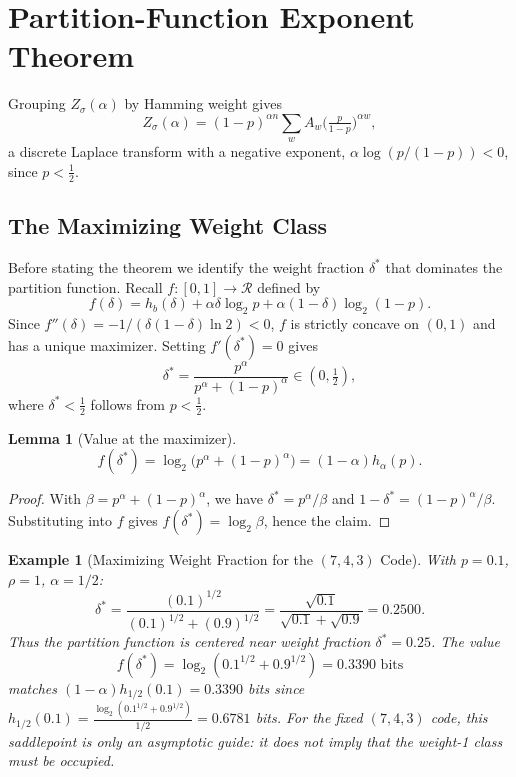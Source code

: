 \documentclass[journal,10pt,onecolumn]{IEEEtran}
\newtheorem{lemma}{Lemma}
\newtheorem{example}{Example}
\newcommand{\Hb}{h_b}
\newcommand{\Rb}{\mathcal{R}}
\begin{document}
\section{Partition-Function Exponent Theorem}
\label{sec:pf}

Grouping $Z_\sigma(\alpha)$ by Hamming weight gives
\[
Z_\sigma(\alpha)=(1-p)^{\alpha n}\sum_w A_w\bigl(\tfrac{p}{1-p}\bigr)^{\alpha w},
\]
a discrete Laplace transform with a negative exponent, $\alpha\log(p/(1-p))<0$, since $p<\tfrac{1}{2}$.



\subsection{The Maximizing Weight Class}

Before stating the theorem we identify the weight fraction
$\delta^*$ that dominates the partition function.
Recall $f:[0,1]\to \Rb$ defined by
\[
    f(\delta)=
    \Hb(\delta)
    +\alpha\delta\log_2 p
    +\alpha(1-\delta)\log_2(1-p).
\]
Since $f''(\delta)=-1/(\delta(1-\delta)\ln 2)<0$, $f$ is strictly
concave on $(0,1)$ and has a unique maximizer.
Setting $f'(\delta^*)=0$ gives
\[
    \delta^*
    =
    \frac{p^\alpha}{p^\alpha+(1-p)^\alpha}
    \in(0,\tfrac{1}{2}),
\]
where $\delta^*<\tfrac{1}{2}$ follows from $p<\tfrac{1}{2}$.

\begin{lemma}[Value at the maximizer]
\label{lem:f_max}
\[
\displaystyle f(\delta^*)
=\log_2\!\bigl(p^\alpha+(1-p)^\alpha\bigr)
=(1-\alpha)h_\alpha(p).\]
\end{lemma}
\begin{proof}
With \(\beta=p^\alpha+(1-p)^\alpha\), we have \(\delta^*=p^\alpha/\beta\) and
\(1-\delta^*=(1-p)^\alpha/\beta\). Substituting into \(f\) gives
\(f(\delta^*)=\log_2 \beta\), hence the claim.
\end{proof}

\begin{example}[Maximizing Weight Fraction for the $(7,4,3)$ Code]
\label{ex:hamming_delta_star}
With $p=0.1$, $\rho=1$, $\alpha=1/2$:
\[
\delta^*=\frac{(0.1)^{1/2}}{(0.1)^{1/2}+(0.9)^{1/2}}
=\frac{\sqrt{0.1}}{\sqrt{0.1}+\sqrt{0.9}}
 = 0.2500.
\]
Thus the partition function is centered near weight fraction
$\delta^* = 0.25$.
The value
\[
f(\delta^*)=\log_2(0.1^{1/2}+0.9^{1/2})
 = 0.3390\text{ bits}
\]
matches $(1-\alpha)h_{1/2}(0.1)=0.3390$ 
bits since \(h_{1/2}(0.1) =\frac{\log_2(0.1^{1/2}+0.9^{1/2})}{1/2} = 0.6781\) bits.
For the fixed $(7,4,3)$ code, this saddlepoint is only an asymptotic guide:
it does not imply that the weight-1 class must be occupied.
\end{example}
\end{document}
